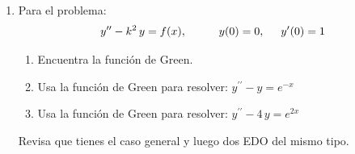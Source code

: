 \documentclass[hidelinks,12pt]{article}
\newcommand{\pderivada}[1]{\ensuremath{{#1}^{\prime}}}
\newcommand{\sderivada}[1]{\ensuremath{{#1}^{\prime \prime}}}
\begin{document}
\begin{enumerate}
        para $n = 1$ es $y_{1}(x) = x$. Ocupando la doble integral del Wronskiano calcula la segunda solución $y_{2}(x)$.
    \item Para el problema:
        \begin{align*}
            \sderivada{y} - k^{2} \, y = f (x), \hspace{1cm} y (0) = 0, \hspace{0.5cm} \pderivada{y} (0) = 1
        \end{align*}
        \begin{enumerate}[label=\alph*)]
            \item Encuentra la función de Green.
            \item Usa la función de Green para resolver: $\sderivada{y} - y = e^{-x}$
            \item Usa la función de Green para resolver: $\sderivada{y} - 4 \, y = e^{2x}$
        \end{enumerate}
        Revisa que tienes el caso general y luego dos EDO del mismo tipo.
\end{enumerate}
\end{document}
